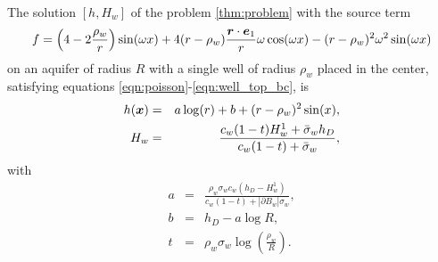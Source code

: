 \begin{thmdef}
The solution $[h,H_w]$ of the problem \ref{thm:problem}
with the source term
\begin{equation} 
  f = \left(4 - 2 \frac{\rho_w}{r} \right) \sin(\omega x)      
                    + 4(r-\rho_w)\frac{\mathbf{\boldsymbol{r}}\cdot\mathbf{\boldsymbol{e}}_1}{r} \omega\cos(\omega x)
                    - (r-\rho_w)^2\omega^2\sin(\omega x)
\end{equation}
on an aquifer of radius $R$ with a single well of radius $\rho_w$ placed in the center, 
satisfying equations \eqref{eqn:poisson}-\eqref{eqn:well_top_bc}, is
\begin{eqnarray}
  h(\mathbf{\boldsymbol{x}}) &=& a\log(r) + b + (r-\rho_w)^2 \sin(x), \\
  H_w &=& \frac{c_w(1-t) H^1_w + \bar{\sigma}_w h_D}{c_w(1-t) + \bar{\sigma}_w},
\end{eqnarray}
with
\begin{eqnarray}
  a &=& \frac{\rho_w\sigma_w c_w (h_D-H^1_w)}{c_w(1-t) + |\partial B_w|\sigma_w}, \nonumber \\
  b &=& h_D - a\log R, \nonumber \\
  t &=& \rho_w\sigma_w\log\left(\frac{\rho_w}{R}\right). \nonumber
\end{eqnarray}
\end{thmdef}



  
 


